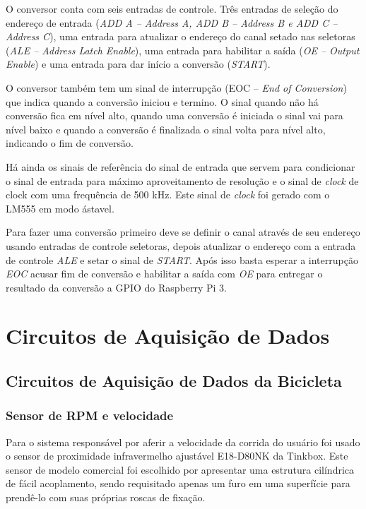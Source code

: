	O conversor conta com seis entradas de controle. Três entradas de seleção do endereço de entrada (\textit{ADD A – Address A, ADD B – Address B e ADD C – Address C}), uma entrada para atualizar o endereço do canal setado nas seletoras (\textit{ALE – Address Latch Enable}), uma entrada para habilitar a saída (\textit{OE – Output Enable}) e uma entrada para dar início a conversão (\textit{START}).

	O conversor também tem um sinal de interrupção (EOC – \textit{End of Conversion}) que indica quando a conversão iniciou e termino. O sinal quando não há conversão fica em nível alto, quando uma conversão é iniciada o sinal vai para nível baixo e quando a conversão é finalizada o sinal volta para nível alto, indicando o fim de conversão.

	Há ainda os sinais de referência do sinal de entrada que servem para condicionar o sinal de entrada para máximo aproveitamento de resolução e o sinal de \textit{clock} de clock com uma frequência de 500 kHz. Este sinal de \textit{clock} foi gerado com o LM555 em modo ástavel. 

	Para fazer uma conversão primeiro deve se definir o canal através de seu endereço usando entradas de controle seletoras, depois atualizar o endereço com a entrada de controle \textit{ALE} e setar o sinal de \textit{START}. Após isso basta esperar a interrupção \textit{EOC} acusar fim de conversão e habilitar a saída com \textit{OE} para entregar o resultado da conversão a GPIO do Raspberry Pi 3.



\section{Circuitos de Aquisição de Dados}

\subsection{Circuitos de Aquisição de Dados da Bicicleta}

\subsubsection{Sensor de RPM e velocidade}    

		Para o sistema responsável por aferir a velocidade da corrida do usuário foi usado o sensor de proximidade infravermelho ajustável E18-D80NK da Tinkbox. Este sensor de modelo comercial foi escolhido por apresentar uma estrutura cilíndrica de fácil acoplamento, sendo requisitado apenas um furo em uma superfície para prendê-lo com suas próprias roscas de fixação.
        
